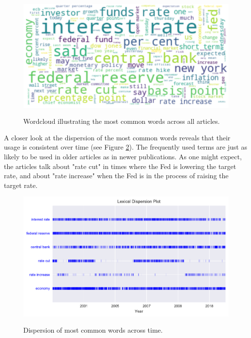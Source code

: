 \documentclass[11pt,a4paper,english,oneside]{book}
\numberwithin{equation}{chapter}
\begin{document}
\begin{figure}
	\caption{Wordcloud illustrating the most common words across all articles.}
	\centering
	\includegraphics[scale=0.2]{Images/wordcloud.pdf}
	\label{wcloud}
\end{figure}

A closer look at the dispersion of the most common words reveals that their usage is consistent over time (see Figure \ref{dispersion}). The frequently used terms are just as likely to be used in older articles as in newer publications. As one might expect, the articles talk about "rate cut" in times where the Fed is lowering the target rate, and about "rate increase" when the Fed is in the process of raising the target rate.

\begin{figure}
	\caption{Dispersion of most common words across time.}
	\centering
	\includegraphics[scale=1]{Images/dispersionplot1.pdf}
	\label{dispersion}
\end{figure}

	
\end{document}
